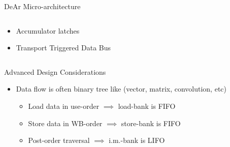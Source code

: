 \documentclass{beamer}
\begin{document}
\begin{CJK}{UTF8}{bkai}
\begin{frame}{DeAr Micro-architecture}
\begin{columns}
\begin{column}{0.35\textwidth}
\begin{block}
\begin{itemize}
{\begin{itemize}
                                    \end{itemize}
                                }
                                \item <4->{Accumulator latches}
                                \item <5->{Transport Triggered Data Bus}
                            \end{itemize}    
                        \end{block}
                    \end{column}
                \end{columns}
            \end{frame}

            \begin{frame}{Advanced Design Considerations}
                \centering
                {
                }
                \pause
                \begin{itemize}
                    \item {Data flow is often binary tree like (vector, matrix, convolution, etc)
                        \begin{itemize}
                                \pause
                                \item Load data in use-order $\implies$ load-bank is FIFO
                                \pause
                                \item Store data in WB-order $\implies$ store-bank is FIFO
                                \pause
                                \item Post-order traversal $\implies$ i.m.-bank is LIFO
                        \end{itemize}}
                \end{itemize}
            \end{frame}


\end{CJK}
\end{document}
